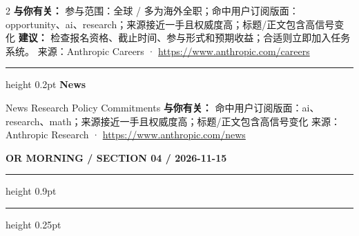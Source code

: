 \documentclass[10.5pt]{ctexart}
\begin{document}
\begin{multicols}{2}
\textbf{与你有关：} 参与范围：全球 / 多为海外全职；命中用户订阅版面：opportunity、ai、research；来源接近一手且权威度高；标题/正文包含高信号变化
\textbf{建议：} 检查报名资格、截止时间、参与形式和预期收益；合适则立即加入任务系统。
{\footnotesize\color{ormuted} 来源：Anthropic Careers · \url{https://www.anthropic.com/careers}}
\vspace{2mm}
\hrule height 0.2pt
\vspace{2mm}
{\large\bfseries News}\par
News Research Policy Commitments
\textbf{与你有关：} 命中用户订阅版面：ai、research、math；来源接近一手且权威度高；标题/正文包含高信号变化
{\footnotesize\color{ormuted} 来源：Anthropic Research · \url{https://www.anthropic.com/news}}
\end{multicols}
\newpage
{\small\bfseries OR MORNING / SECTION 04 / 2026-11-15}
\vspace{2mm}
\hrule height 0.9pt
\vspace{1.5mm}
\hrule height 0.25pt
\vspace{4mm}
\end{document}
